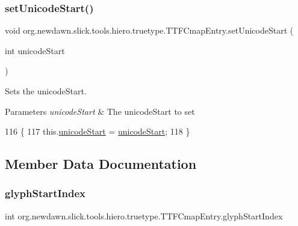 \subsubsection{\texorpdfstring{set\+Unicode\+Start()}{setUnicodeStart()}}
{\footnotesize\ttfamily void org.\+newdawn.\+slick.\+tools.\+hiero.\+truetype.\+T\+T\+F\+Cmap\+Entry.\+set\+Unicode\+Start (\begin{DoxyParamCaption}\item[{int}]{unicode\+Start }\end{DoxyParamCaption})\hspace{0.3cm}{\ttfamily [inline]}}

Sets the unicode\+Start. 
\begin{DoxyParams}{Parameters}
{\em unicode\+Start} & The unicode\+Start to set \\
\hline
\end{DoxyParams}

\begin{DoxyCode}
116                                                   \{
117         this.\mbox{\hyperlink{classorg_1_1newdawn_1_1slick_1_1tools_1_1hiero_1_1truetype_1_1_t_t_f_cmap_entry_abfc190d70995c9dab4cd3a9c42695f61}{unicodeStart}} = \mbox{\hyperlink{classorg_1_1newdawn_1_1slick_1_1tools_1_1hiero_1_1truetype_1_1_t_t_f_cmap_entry_abfc190d70995c9dab4cd3a9c42695f61}{unicodeStart}};
118     \}
\end{DoxyCode}


\subsection{Member Data Documentation}
\mbox{\label{classorg_1_1newdawn_1_1slick_1_1tools_1_1hiero_1_1truetype_1_1_t_t_f_cmap_entry_ad7d0da37875efc20244b93ad930d73ad}} 
\subsubsection{\texorpdfstring{glyph\+Start\+Index}{glyphStartIndex}}
{\footnotesize\ttfamily int org.\+newdawn.\+slick.\+tools.\+hiero.\+truetype.\+T\+T\+F\+Cmap\+Entry.\+glyph\+Start\+Index\hspace{0.3cm}{\ttfamily [private]}}

